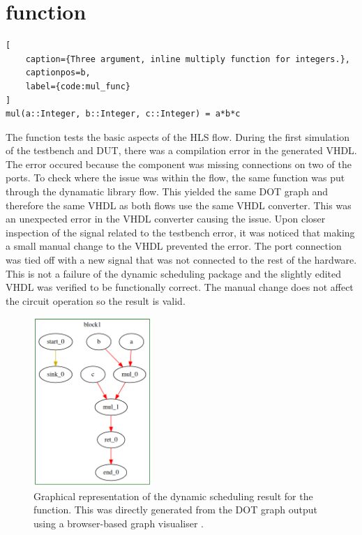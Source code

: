 \pagebreak

\section{ function}
\label{sec:mul}

\begin{lstlisting}[
    caption={Three argument, inline multiply function for integers.},
    captionpos=b, 
    label={code:mul_func}
]
mul(a::Integer, b::Integer, c::Integer) = a*b*c
\end{lstlisting}

The  function tests the basic aspects of the HLS flow. During the first simulation of the testbench and DUT, there was a compilation error in the generated VHDL. The error occured because the  component was missing connections on two of the ports. To check where the issue was within the flow, the same  function was put through the dynamatic library flow. This yielded the same DOT graph and therefore the same VHDL as both flows use the same VHDL converter. This was an unexpected error in the VHDL converter causing the issue. Upon closer inspection of the signal related to the testbench error, it was noticed that making a small manual change to the VHDL prevented the error. The port connection was tied off with a new signal that was not connected to the rest of the hardware. This is not a failure of the dynamic scheduling package and the slightly edited VHDL was verified to be functionally correct. The manual change does not affect the circuit operation so the result is valid.

\begin{figure}[htb!]
    \centering
    \includegraphics[width=0.4\textwidth]{Images/mul_dot.png}
    \caption{Graphical representation of the dynamic scheduling result for the  function. This was directly generated from the DOT graph output using a browser-based graph visualiser \cite{graphviz}.}
    \label{fig:mul_dot}
\end{figure}

